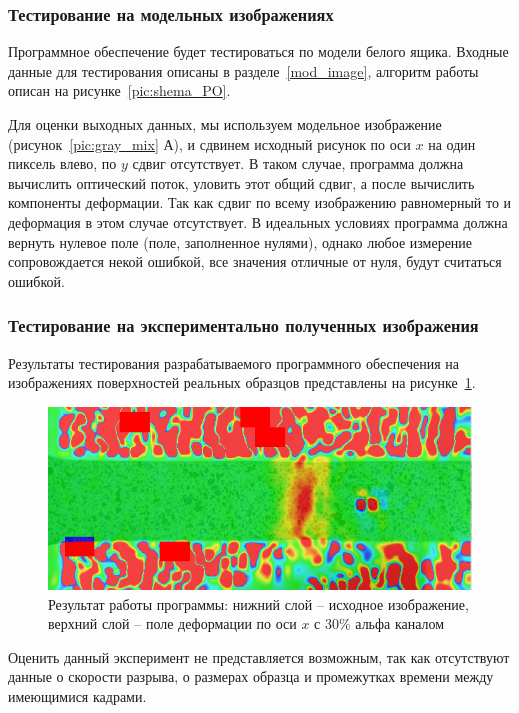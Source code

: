 \subsubsection{Тестирование на модельных изображениях}

Программное обеспечение будет тестироваться по модели белого ящика. Входные данные для тестирования описаны в разделе~\ref{mod_image}, алгоритм работы описан на рисунке~\ref{pic:shema_PO}.

Для оценки выходных данных, мы используем модельное изображение (рисунок~\ref{pic:gray_mix} А), и сдвинем исходный рисунок по оси $x$ на один пиксель влево, по $y$ сдвиг отсутствует.
В таком случае, программа должна вычислить оптический поток, уловить этот общий сдвиг, а после вычислить компоненты деформации. Так как сдвиг по всему изображению равномерный то и деформация в этом случае отсутствует. В идеальных условиях программа должна вернуть нулевое поле (поле, заполненное нулями), однако любое измерение сопровождается некой ошибкой, все значения отличные от нуля, будут считаться ошибкой.

\subsubsection{Тестирование на экспериментально полученных изображения}
Результаты тестирования разрабатываемого программного обеспечения на изображениях поверхностей реальных образцов представлены на рисунке~\ref{fig:al_strain}.

\begin{figure}
\centering
\includegraphics[width=0.7\linewidth]{images/al_strain}
\caption{Результат работы программы: нижний слой -- исходное изображение, верхний слой -- поле деформации по оси $x$ с 30\% альфа каналом}
\label{fig:al_strain}
\end{figure}
Оценить данный эксперимент не представляется возможным, так как отсутствуют данные о скорости разрыва, о размерах образца и промежутках времени между имеющимися кадрами.

